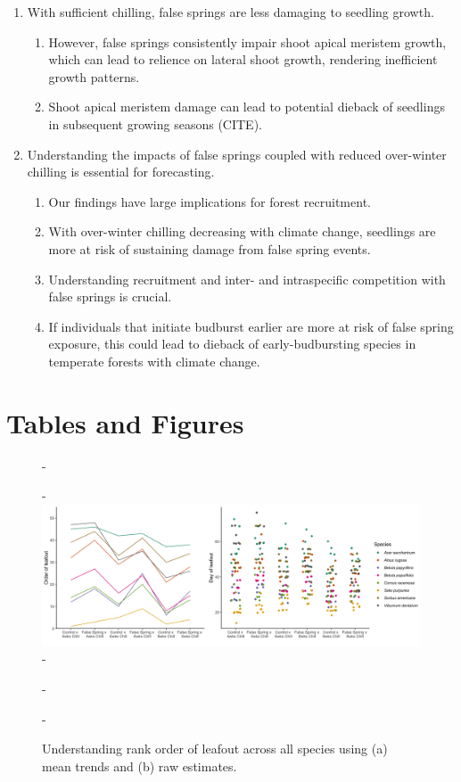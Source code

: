 \documentclass{article}\usepackage[]{graphicx}\usepackage[]{color}
\begin{document}
\begin{enumerate}
\item With sufficient chilling, false springs are less damaging to seedling growth.
  \begin{enumerate}
  \item However, false springs consistently impair shoot apical meristem growth, which can lead to relience on lateral shoot growth, rendering inefficient growth patterns.
  \item Shoot apical meristem damage can lead to potential dieback of seedlings in subsequent growing seasons (CITE). 
  \end{enumerate}
  
\item Understanding the impacts of false springs coupled with reduced over-winter chilling is essential for forecasting.
  \begin{enumerate}
  \item Our findings have large implications for forest recruitment.
  \item With over-winter chilling decreasing with climate change, seedlings are more at risk of sustaining damage from false spring events. 
  \item Understanding recruitment and inter- and intraspecific competition with false springs is crucial. 
  \item If individuals that initiate budburst earlier are more at risk of false spring exposure, this could lead to dieback of early-budbursting species in temperate forests with climate change.
  \end{enumerate}
\end{enumerate}






\section*{Tables and Figures}
  {\begin{figure} [H]
  -\begin{center}
  -\includegraphics[width=18cm]{..//analyses/figures/leafout_orderandraw.png} 
  -\caption{Understanding rank order of leafout across all species using (a) mean trends and (b) raw estimates. }\label{fig:rank}
  -\end{center}
  -\end{figure}}
  
\end{document}

